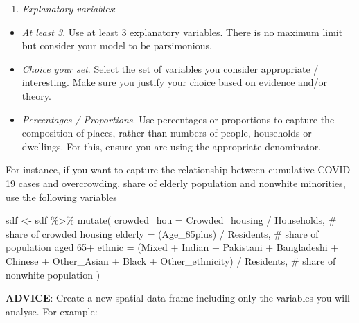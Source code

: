 \documentclass[
  letterpaper,
  DIV=11,
  numbers=noendperiod,
  oneside]{scrreprt}
\newenvironment{Shaded}{\begin{snugshade}}{\end{snugshade}}
\newcommand{\AttributeTok}[1]{\textcolor[rgb]{0.40,0.45,0.13}{#1}}
\newcommand{\CommentTok}[1]{\textcolor[rgb]{0.37,0.37,0.37}{#1}}
\newcommand{\FunctionTok}[1]{\textcolor[rgb]{0.28,0.35,0.67}{#1}}
\newcommand{\NormalTok}[1]{\textcolor[rgb]{0.00,0.23,0.31}{#1}}
\newcommand{\OtherTok}[1]{\textcolor[rgb]{0.00,0.23,0.31}{#1}}
\newcommand{\SpecialCharTok}[1]{\textcolor[rgb]{0.37,0.37,0.37}{#1}}
\providecommand{\tightlist}{%
  \setlength{\itemsep}{0pt}\setlength{\parskip}{0pt}}\usepackage{longtable,booktabs,array}
\begin{document}
\begin{enumerate}
\def\labelenumi{\arabic{enumi}.}
\setcounter{enumi}{1}
\tightlist
\item
  \emph{Explanatory variables}:
\end{enumerate}

\begin{itemize}
\item
  \emph{At least 3}. Use at least 3 explanatory variables. There is no
  maximum limit but consider your model to be parsimonious.
\item
  \emph{Choice your set}. Select the set of variables you consider
  appropriate / interesting. Make sure you justify your choice based on
  evidence and/or theory.
\item
  \emph{Percentages / Proportions}. Use percentages or proportions to
  capture the composition of places, rather than numbers of people,
  households or dwellings. For this, ensure you are using the
  appropriate denominator.
\end{itemize}

For instance, if you want to capture the relationship between cumulative
COVID-19 cases and overcrowding, share of elderly population and
nonwhite minorities, use the following variables

\begin{Shaded}
\begin{Highlighting}[]
\NormalTok{sdf }\OtherTok{\textless{}{-}}\NormalTok{ sdf }\SpecialCharTok{\%\textgreater{}\%} \FunctionTok{mutate}\NormalTok{(}
  \AttributeTok{crowded\_hou =}\NormalTok{ Crowded\_housing }\SpecialCharTok{/}\NormalTok{ Households, }\CommentTok{\# share of crowded housing}
  \AttributeTok{elderly =}\NormalTok{ (Age\_85plus) }\SpecialCharTok{/}\NormalTok{ Residents, }\CommentTok{\# share of population aged 65+}
  \AttributeTok{ethnic =}\NormalTok{ (Mixed }\SpecialCharTok{+}\NormalTok{ Indian }\SpecialCharTok{+}\NormalTok{ Pakistani }\SpecialCharTok{+}\NormalTok{ Bangladeshi }\SpecialCharTok{+}\NormalTok{ Chinese }\SpecialCharTok{+}\NormalTok{ Other\_Asian }\SpecialCharTok{+}\NormalTok{ Black }\SpecialCharTok{+}\NormalTok{ Other\_ethnicity) }\SpecialCharTok{/}\NormalTok{ Residents, }\CommentTok{\# share of nonwhite population}
\NormalTok{)}
\end{Highlighting}
\end{Shaded}

\textbf{ADVICE}: Create a new spatial data frame including only the
variables you will analyse. For example:
\end{document}

